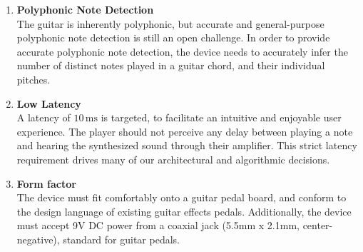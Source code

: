 \documentclass[12pt]{article}
\begin{document}
\begin{enumerate}[label=(\alph*)]

    \item \textbf{Polyphonic Note Detection} \\
    The guitar is inherently polyphonic, but accurate and general-purpose polyphonic note detection is still an open challenge. In order to provide accurate polyphonic note detection, the device needs to accurately infer the number of distinct notes played in a guitar chord, and their individual pitches.

    \item \textbf{Low Latency} \\
    A latency of $10\,\text{ms}$ is targeted, to facilitate an intuitive and enjoyable user experience. The player should not perceive any delay between playing a note and hearing the synthesized sound through their amplifier. This strict latency requirement drives many of our architectural and algorithmic decisions.

    \item \textbf{Form factor} \\
    The device must fit comfortably onto a guitar pedal board, and conform to the design language of existing guitar effects pedals. Additionally, the device must accept 9V DC power from a coaxial jack (5.5mm x 2.1mm, center-negative), standard for guitar pedals.


\end{enumerate}

\end{document}
